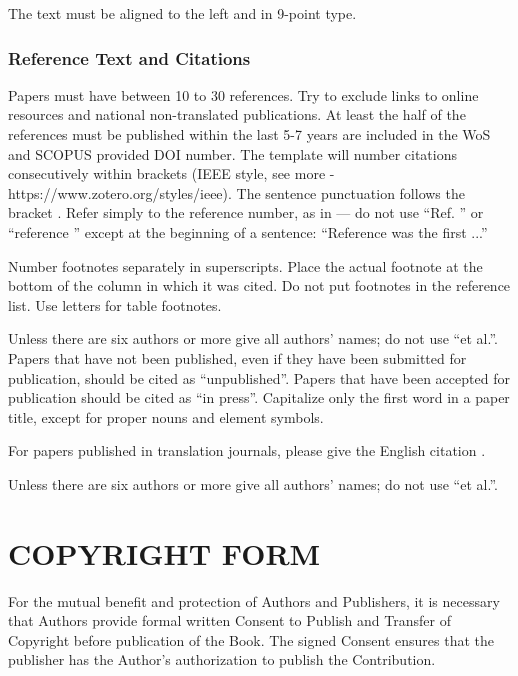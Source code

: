\documentclass[a4paper,twoside]{article}
\begin{document}
The text must be aligned to the left and in 9-point type.

\vfill
\subsubsection{Reference Text and Citations}

\noindent Papers must have between 10 to 30 references. Try to exclude links to online resources and national non-translated publications. At least the half of the references must be published within the last 5-7 years are included in the WoS and SCOPUS provided DOI number. The template will number citations consecutively within brackets \cite{eason1955certain} (IEEE style, see more - https://www.zotero.org/styles/ieee). The sentence punctuation follows the bracket \cite{maxwell1873treatise, salter2011geographical, kampmann2019using}. Refer simply to the reference number, as in \cite{jacobs1963fine} --- do not use “Ref. \cite{maxwell1873treatise}” or “reference \cite{maxwell1873treatise}” except at the beginning of a sentence: “Reference \cite{maxwell1873treatise} was the first ...”


Number footnotes separately in superscripts. Place the actual footnote at the bottom of the column in which it was cited. Do not put footnotes in the reference list. Use letters for table footnotes.


Unless there are six authors or more give all authors’ names; do not use “et al.”. Papers that have not been published, even if they have been submitted for publication, should be cited as “unpublished”. Papers that have been accepted for publication should be cited as “in press”. Capitalize only the first word in a paper title, except for proper nouns and element symbols.


For papers published in translation journals, please give the English citation \cite{yorozu1987electron}.


Unless there are six authors or more give all authors’ names; do not use “et al.”.

\section{\uppercase{Copyright Form}}

\noindent For the mutual benefit and protection of Authors and
Publishers, it is necessary that Authors provide formal written
Consent to Publish and Transfer of Copyright before publication of
the Book. The signed Consent ensures that the publisher has the
Author's authorization to publish the Contribution.
\end{document}
